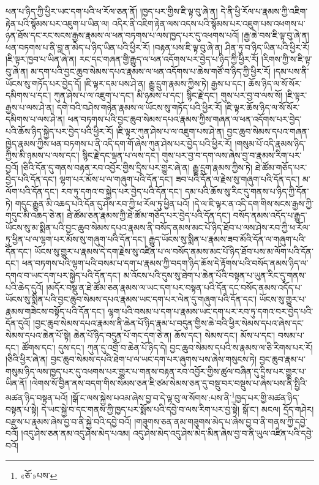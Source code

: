 ཕན་པ་ཉིད་ཀྱི་ཕྱིར་ཡང་དག་པའི་ཕ་རོལ་ཅན་ནོ། །ཁྱད་པར་གྱིས་ཇི་ལྟ་བུ་ཞེ་ན། དེ་ནི་ཕྱི་རོལ་པ་རྣམས་ཀྱི་འཇིག་རྟེན་པའི་སྙོམས་པར་འཇུག་པ་ཡིན་ལ། འདིར་ནི་འཇིག་རྟེན་ལས་འདས་པའི་སྙོམས་པར་འཇུག་པས་འཕགས་པ་ཉན་ཐོས་དང་རང་སངས་རྒྱས་རྣམས་ལ་ཕན་བཏགས་པ་ལས་ཁྱད་པར་དུ་འཕགས་པའོ། །རྒྱ་ཆེ་བས་ཇི་ལྟ་བུ་ཞེ་ན། ཕན་བཏགས་པ་ནི་བླ་ན་མེད་པ་ཉིད་ཡིན་པའི་ཕྱིར་རོ། །བརྟན་པས་ཇི་ལྟ་བུ་ཞེ་ན། ཤིན་ཏུ་བ་ཉིད་ཡིན་པའི་ཕྱིར་རོ། །ཇི་ལྟར་ཁྱབ་པ་ཡིན་ཞེ་ན། རང་དང་གཞན་གྱི་རྒྱུད་ལ་ཕན་འདོགས་པར་བྱེད་པ་ཉིད་ཀྱི་ཕྱིར་རོ། །རིགས་ཀྱི་ས་ཇི་ལྟ་བུ་ཞེ་ན། མ་དག་པའི་བྱང་ཆུབ་སེམས་དཔའ་རྣམས་ལ་ཕན་འདོགས་པ་ཆེས་གཙོ་བ་ཉིད་ཀྱི་ཕྱིར་རོ། །དམ་པས་ནི་ཡོངས་སུ་གཏོད་པར་བྱེད་དོ། །ཇི་ལྟར་དམ་པས་ཤེ་ན། རྒྱུ་དྲུག་རྣམས་ཀྱིས་ཏེ། རྒྱས་པ་དང་། ཆོས་ཉིད་ལ་སོ་སོར་དམིགས་པ་དང་། ཀུན་ཤེས་པ་ལ་འཇུག་པ་དང་། མི་ཉམས་པ་དང་། སྙིང་རྗེ་དང་། གུས་པར་བྱ་བ་ལས་སོ། །ཇི་ལྟར་རྒྱས་པ་ལས་ཤེ་ན། དགེ་བའི་བཤེས་གཉེན་རྣམས་ལ་ཡོངས་སུ་གཏོད་པའི་ཕྱིར་རོ། །ཇི་ལྟར་ཆོས་ཉིད་ལ་སོ་སོར་དམིགས་པ་ལས་ཤེ་ན། ཕན་བཏགས་པའི་བྱང་ཆུབ་སེམས་དཔའ་རྣམས་ཀྱིས་གཞན་ལ་ཕན་འདོགས་པར་བྱེད་པའི་ཆོས་ཉིད་སྐྱེད་པར་བྱེད་པའི་ཕྱིར་རོ། །ཇི་ལྟར་ཀུན་ཤེས་པ་ལ་འཇུག་པས་ཤེ་ན། བྱང་ཆུབ་སེམས་དཔའ་གཞན་ཁྱེད་རྣམས་ཀྱིས་ཕན་བཏགས་པ་ནི་འདི་དག་གོ་ཞེས་ཀུན་ཤེས་པར་བྱེད་པའི་ཕྱིར་རོ། །གསུམ་པོ་འདི་རྣམས་ཉིད་ཀྱིས་མི་ཉམས་པ་ལས་དང་། སྙིང་རྗེ་དང་ལྡན་པ་ལས་དང་། གུས་པར་བྱ་བ་དག་ལས་ཞེས་བྱ་བ་རྣམས་རིག་པར་བྱའོ། །ཅིའི་དོན་དུ་གནས་བརྟན་རབ་འབྱོར་གྱིས་དྲིས་པར་གྱུར་ཞེ་ན། རྒྱུ་དྲུག་རྣམས་ཀྱིས་ཏེ། ཐེ་ཚོམ་གཅོད་པར་བྱེད་པའི་དོན་དང་། ལྷག་པར་མོས་པ་ལ་གཞུག་པའི་དོན་དང་། ཟབ་པའི་དོན་ལ་རྗེས་སུ་གཞུག་པའི་དོན་དང་། མ་ལོག་པའི་དོན་དང་། རབ་ཏུ་དགའ་བ་སྐྱེད་པར་བྱེད་པའི་དོན་དང་། དམ་པའི་ཆོས་སུ་རིང་དུ་གནས་པ་ཉིད་ཀྱི་དོན་ཏེ། གདུང་རྒྱུན་མི་འཆད་པའི་དོན་དུ་ཤེས་རབ་ཀྱི་ཕ་རོལ་ཏུ་ཕྱིན་པའོ། །དེ་ལ་ཇི་ལྟར་ན་འདི་དག་གིས་སངས་རྒྱས་ཀྱི་གདུང་མི་འཆད་ཅེ་ན། ཐེ་ཚོམ་ཅན་རྣམས་ཀྱི་ཐེ་ཚོམ་གཅོད་པར་བྱེད་པའི་དོན་དང་། བསོད་ནམས་འདོད་པ་རྒྱུད་ཡོངས་སུ་མ་སྨིན་པའི་བྱང་ཆུབ་སེམས་དཔའ་རྣམས་ནི་བསོད་ནམས་མང་པོ་ཉིད་ཐོབ་པ་ལས་ཤེས་རབ་ཀྱི་ཕ་རོལ་ཏུ་ཕྱིན་པ་ལ་ལྷག་པར་མོས་སུ་གཞུག་པའི་དོན་དང་། རྒྱུད་ཡོངས་སུ་སྨིན་པ་རྣམས་ཟབ་མོའི་དོན་ལ་གཞུག་པའི་དོན་དང་། ཡོངས་སུ་གྱུར་པ་རྣམས་དེ་དག་རྗེས་སུ་འཛིན་པ་ལ་བསོད་ནམས་མང་པོ་ཉིད་ཐོབ་པས་མ་ལོག་པའི་དོན་དང་། ཕན་བཏགས་པའི་ལྷག་པའི་བསམ་པ་དག་པ་རྣམས་ཀྱི་བདག་ཉིད་ཆོས་དེ་རྟོགས་པའི་བསོད་ནམས་ཉིད་ལ་དགའ་བ་ཡང་དག་པར་སྐྱེད་པའི་དོན་དང་། མ་འོངས་པའི་དུས་སུ་ཐེག་པ་ཆེན་པོའི་བསྟན་པ་ཡུན་རིང་དུ་གནས་པའི་ཆེད་དུའོ། །མདོར་བསྡུ་ན་ཐེ་ཚོམ་ཅན་རྣམས་ལ་ཡང་དག་པར་བསྟན་པའི་དོན་དང་བསོད་ནམས་འདོད་པ་ཡོངས་སུ་སྨིན་པའི་བྱང་ཆུབ་སེམས་དཔའ་རྣམས་ཡང་དག་པར་ལེན་དུ་གཞུག་པའི་དོན་དང་། ཡོངས་སུ་གྱུར་པ་རྣམས་གཟེངས་བསྟོད་པའི་དོན་དང་། ལྷག་པའི་བསམ་པ་དག་པ་རྣམས་ཡང་དག་པར་རབ་ཏུ་དགའ་བར་བྱེད་པའི་དོན་དུའོ། །བྱང་ཆུབ་སེམས་དཔའ་རྣམས་ནི་ཆེན་པོ་ཉིད་རྣམ་པ་བདུན་གྱིས་ཆེ་བའི་ཕྱིར་སེམས་དཔའ་ཞེས་དང་སེམས་དཔའ་ཆེན་པོ་སྟེ། ཆེན་པོ་ཉིད་བདུན་པོ་གང་དག་ཅེ་ན། ཆོས་དང་། སེམས་དང་། མོས་པ་དང་། བསམ་པ་དང་། ཚོགས་དང་། དུས་དང་། ཀུན་དུ་འགྲོ་བ་ཆེན་པོ་ཉིད་དེ། བྱང་ཆུབ་སེམས་དཔའི་ས་རྣམས་ལ་ཅི་རིགས་པར་རོ། །ཅིའི་ཕྱིར་ཞེ་ན། བྱང་ཆུབ་སེམས་དཔའི་ཐེག་པ་ལ་ཡང་དག་པར་ཞུགས་པས་ཞེས་གསུངས་ཏེ། བྱང་ཆུབ་རྣམ་པ་གསུམ་ཉིད་ལས་ཁྱད་པར་དུ་འཕགས་པར་གྱུར་པ་གནས་བརྟན་རབ་འབྱོར་གྱིས་ཚུལ་བཞིན་དུ་དྲིས་པར་གྱུར་པ་ཡིན་ནོ། །ལེགས་སོ་བྱིན་ནས་བདག་གིས་སེམས་ཅན་ཇི་ཙམ་སེམས་ཅན་དུ་བསྡུ་བར་བསྡུས་པ་ཞེས་པས་ནི་སྤྱིའི་མཚན་ཉིད་བསྟན་པའོ། །སྒོ་ང་ལས་སྐྱེས་པའམ་ཞེས་བྱ་བ་དེ་ལྟ་བུ་ལ་སོགས་:པས་ནི་\footnote{«ཅོ་»པས་}ཁྱད་པར་གྱི་མཚན་ཉིད་བསྟན་པ་སྟེ། དེ་ཡང་སྐྱེ་བ་དང་གནས་ཀྱི་ཁྱད་པར་སྨོས་པའི་དབྱེ་བ་ལས་རིག་པར་བྱ་སྟེ། སྒོ་ང་། མངལ། དྲོད་གཤེར། བརྫུས་པ་རྣམས་ཞེས་བྱ་བ་ནི་སྐྱེ་བའི་དབྱེ་བའོ། །གཟུགས་ཅན་ནམ་གཟུགས་མེད་པ་ཞེས་བྱ་བ་ནི་གནས་ཀྱི་དབྱེ་བའོ། །འདུ་ཤེས་ཅན་ནམ་འདུ་ཤེས་མེད་པའམ། འདུ་ཤེས་མེད་འདུ་ཤེས་མེད་མིན་ཞེས་བྱ་བ་ནི་ཡུལ་འཛིན་པའི་དབྱེ་བའོ། 